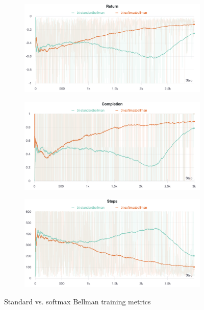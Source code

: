 \documentclass[a4paper,10pt]{report}
\begin{document}
\begin{figure}[h]
	\centering
	\captionsetup[subfigure]{justification=centering}
	\begin{subfigure}[b]{\linewidth}
		\includegraphics[width=\textwidth]{bellman-operators-returns}
	\end{subfigure}
	
	\begin{subfigure}[b]{\linewidth}
		\includegraphics[width=\textwidth]{bellman-operators-completions}
	\end{subfigure}
	
	\begin{subfigure}[b]{\linewidth}
		\includegraphics[width=\textwidth]{bellman-operators-steps}
	\end{subfigure}

	\caption{Standard vs. softmax Bellman training metrics}
	\label{fig:bellman-operators-metrics}
\end{figure}
\clearpage
\end{document}
